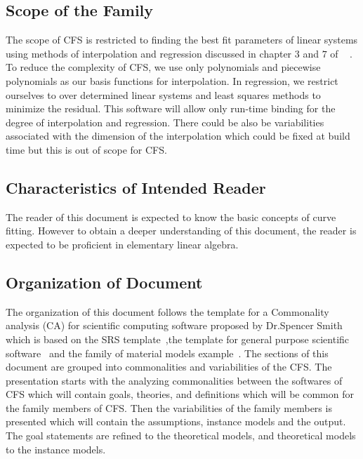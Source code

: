 \documentclass[12pt]{article}
\newcommand{\famname}{CFS} %
\begin{document}
\subsection{Scope of the Family}\label{Scope}
The scope of \famname{} is restricted to finding the best fit parameters of 
linear systems using methods of interpolation and regression discussed in 
chapter $3$ and $7$ of ~\cite{Health1997} . To reduce the complexity of 
\famname{}, we use only polynomials and piecewise polynomials as our basis 
functions for interpolation. In regression, we restrict ourselves to over 
determined linear systems and least squares methods to minimize the residual.
This software will allow only run-time binding for the degree of interpolation 
and regression. There could be also be variabilities associated with the
dimension of the interpolation which could be fixed at build time but this is 
out of scope for \famname{}.\\


 

\subsection{Characteristics of Intended Reader} 
The reader of this document is expected to know the basic concepts of curve fitting. However to obtain a deeper understanding of this document, the reader is expected to be proficient in elementary linear algebra.

\subsection{Organization of Document}
The organization of this document follows the template for a Commonality analysis (CA) for scientific computing software proposed by Dr.Spencer Smith which is based on the SRS template~\cite{SmithEtAl2007},the template for general purpose scientific software~\cite{Smith2006} and the family of material models example~\cite{SmithMcCutchanAndCarette2017}. The sections of this document are grouped into commonalities and variabilities of the \famname{}. The presentation starts with the analyzing commonalities between the softwares of \famname{} which will contain goals, theories,  and definitions which will be common for the family members of \famname{}. Then the variabilities of the family members is presented which will contain the assumptions, instance models and the output. The goal statements are refined to the theoretical models, and theoretical models to the instance models.
\end{document}
